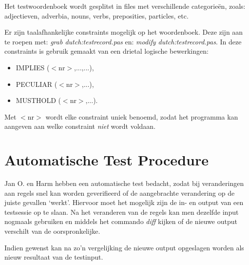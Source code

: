 Het testwoordenboek wordt gesplitst in files met verschillende categorie\"{e}n,
zoals: adjectieven, adverbia, nouns, verbs, preposities, particles, etc.

Er zijn taalafhankelijke constraints mogelijk op het woordenboek. Deze zijn 
aan te roepen met: {\em grab dutch:testrecord.pas} en: 
{\em modify dutch:testrecord.pas}.
In deze constraints is gebruik gemaakt van een drietal logische bewerkingen:
\begin{itemize}
   \item IMPLIES ($<$nr$>$,...,...), 
   \item PECULIAR ($<$nr$>$,...), 
   \item MUSTHOLD ($<$nr$>$,...).
\end{itemize}
Met $<$nr$>$ wordt elke constraint uniek benoemd, zodat het programma kan 
aangeven aan welke constraint {\em niet} wordt voldaan.

\section{Automatische Test Procedure}

Jan O. en Harm hebben een automatische test bedacht, zodat bij veranderingen 
aan regels snel kan worden geverifieerd of de aangebrachte verandering op de
juiste gevallen `werkt'. Hiervoor moet het mogelijk zijn de in- en output van 
een testsessie op te slaan. Na het veranderen van de regels kan men dezelfde 
input nogmaals gebruiken en middels het commando {\em diff} kijken of
de nieuwe output verschilt van de oorspronkelijke.

Indien gewenst kan na zo'n vergelijking de nieuwe output opgeslagen worden als 
nieuw resultaat van de testinput.


